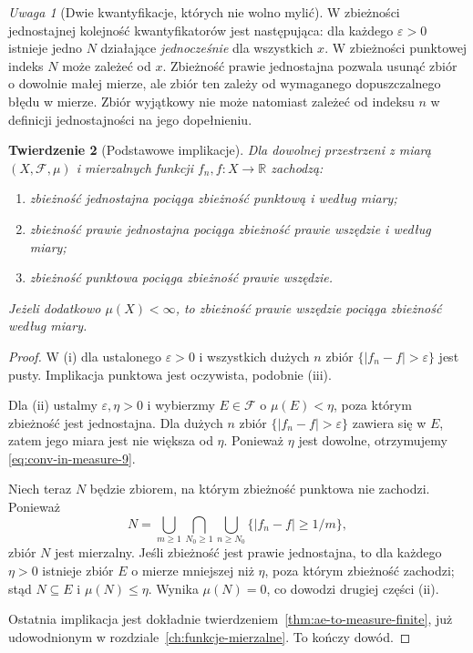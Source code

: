 \documentclass[11pt,a4paper,oneside]{book}
\numberwithin{equation}{chapter}
\theoremstyle{plain}
\newtheorem{twierdzenie}{Twierdzenie}[chapter]
\theoremstyle{definition}
\theoremstyle{remark}
\newtheorem{uwaga}[twierdzenie]{Uwaga}
\begin{document}
\begin{uwaga}[Dwie kwantyfikacje, których nie wolno mylić]
W zbieżności jednostajnej kolejność kwantyfikatorów jest
następująca: dla każdego $\varepsilon>0$ istnieje jedno $N$
działające \emph{jednocześnie} dla wszystkich $x$. W zbieżności
punktowej indeks $N$ może zależeć od $x$. Zbieżność prawie
jednostajna pozwala usunąć zbiór o dowolnie małej mierze,
ale zbiór ten zależy od wymaganego dopuszczalnego błędu w mierze.
Zbiór wyjątkowy nie może natomiast zależeć od indeksu $n$
w definicji jednostajności na jego dopełnieniu.
\end{uwaga}

\begin{twierdzenie}[Podstawowe implikacje]
\label{thm:conv-implications-9}
Dla dowolnej przestrzeni z miarą $(X,\mathcal F,\mu)$
i mierzalnych funkcji $f_n,f:X\to\mathbb R$ zachodzą:
\begin{enumerate}[label=\textup{(\roman*)}]
\item zbieżność jednostajna pociąga zbieżność punktową
i według miary;
\item zbieżność prawie jednostajna pociąga zbieżność
prawie wszędzie i według miary;
\item zbieżność punktowa pociąga zbieżność prawie wszędzie.
\end{enumerate}
Jeżeli dodatkowo $\mu(X)<\infty$, to zbieżność prawie
wszędzie pociąga zbieżność według miary.
\end{twierdzenie}
\begin{proof}
W (i) dla ustalonego $\varepsilon>0$ i wszystkich dużych
$n$ zbiór $\{|f_n-f|>\varepsilon\}$ jest pusty.
Implikacja punktowa jest oczywista, podobnie (iii).

Dla (ii) ustalmy $\varepsilon,\eta>0$ i wybierzmy
$E\in\mathcal F$ o $\mu(E)<\eta$, poza którym zbieżność
jest jednostajna. Dla dużych $n$ zbiór
$\{|f_n-f|>\varepsilon\}$ zawiera się w $E$,
zatem jego miara jest nie większa od $\eta$.
Ponieważ $\eta$ jest dowolne, otrzymujemy
\eqref{eq:conv-in-measure-9}.

Niech teraz $N$ będzie zbiorem, na którym zbieżność
punktowa nie zachodzi. Ponieważ
\[
N=\bigcup_{m\ge1}\bigcap_{N_0\ge1}
\bigcup_{n\ge N_0}\{|f_n-f|\ge 1/m\},
\]
zbiór $N$ jest mierzalny. Jeśli zbieżność jest prawie
jednostajna, to dla każdego $\eta>0$ istnieje zbiór
$E$ o mierze mniejszej niż $\eta$, poza którym zbieżność
zachodzi; stąd $N\subseteq E$ i $\mu(N)\le\eta$.
Wynika $\mu(N)=0$, co dowodzi drugiej części (ii).

Ostatnia implikacja jest dokładnie twierdzeniem~\ref{thm:ae-to-measure-finite}, już udowodnionym w rozdziale~\ref{ch:funkcje-mierzalne}. To kończy dowód.
\end{proof}
\end{document}
